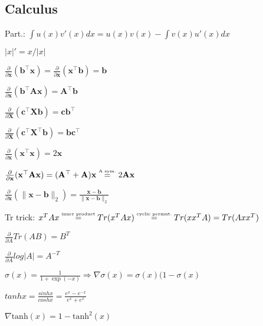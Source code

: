 \subsection*{Calculus}
\begin{inparaitem}[\color{black}\textbullet]
	\item Part.: $\int u(x)v'(x) dx = u(x)v(x) - \int v(x)u'(x) dx$\\
	\item $|x|'=x/|x|$ \quad
	\item $\frac{\partial}{\partial \mathbf{x}}(\mathbf{b}^\top \mathbf{x}) = \frac{\partial}{\partial \mathbf{x}}(\mathbf{x}^\top \mathbf{b}) = \mathbf{b}$\\
	\item $\frac{\partial}{\partial \mathbf{x}}(\mathbf{b}^\top \mathbf{A}\mathbf{x}) = \mathbf{A}^\top \mathbf{b}$ \quad
	\item $\frac{\partial}{\partial \mathbf{X}}(\mathbf{c}^\top \mathbf{X} \mathbf{b}) = \mathbf{c}\mathbf{b}^\top$\\
	\item $\frac{\partial}{\partial \mathbf{X}}(\mathbf{c}^\top \mathbf{X}^\top \mathbf{b}) = \mathbf{b}\mathbf{c}^\top$
	\item $\frac{\partial}{\partial \mathbf{x}}(\mathbf{x}^\top \mathbf{x}) = 2\mathbf{x}$\\
	\item $\frac{\partial}{\partial \mathbf{x}}(\mathbf{x}^\top \mathbf{A}\mathbf{x}) = (\mathbf{A}^\top + \mathbf{A})\mathbf{x} \stackrel{\text{\tiny A sym.}}{=} 2\mathbf{A}\mathbf{x}$ \\
	\item $\frac{\partial}{\partial \mathbf{x}}(\| \mathbf{x}-\mathbf{b} \|_2) = \frac{\mathbf{x}-\mathbf{b}}{\|\mathbf{x}-\mathbf{b}\|_2}$ \\
	\item Tr trick: $x^T A x \stackrel{\text{\tiny inner product}}{=} Tr(x^T A x) \stackrel{\text{\tiny cyclic permut.}}{=} Tr(x x^T A) = Tr(A x x^T)$ \\
	\item $\tfrac{\partial}{\partial A} Tr(AB) {=} B^T$
	\item $\frac{\partial}{\partial A} log|A| {=} A^{-T}$ \\
	\item $\sigma(x) = \frac{1}{1+\exp(-x)} \Rightarrow \nabla \sigma(x)=\sigma(x)(1-\sigma(x) $ \\
	\item $tanhx {=} \frac{sinhx}{coshx} {=} \frac{e^{x}-e^{-x}}{e^{x} + e^{x}}$
	\item $\nabla \text{tanh}(x) = 1-\text{tanh}^2(x)$ 

\end{inparaitem}
